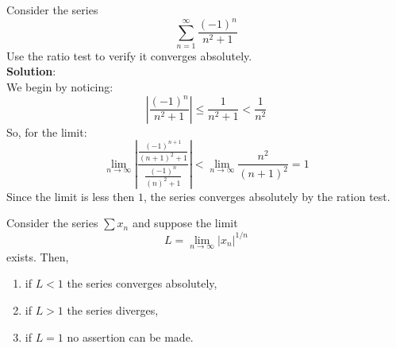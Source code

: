\begin{eg}
    Consider the series
    \begin{equation*}
        \sum \limits_{n=1}^\infty \frac{(-1)^n}{n^2+1}
    \end{equation*}
    Use the ratio test to verify it converges absolutely. \\
    \textbf{Solution}: \\
    We begin by noticing:
    \begin{equation*}
        \left |
            \frac{(-1)^n}{n^2+1}
        \right | \leq
        \frac{1}{n^2+1} <
        \frac{1}{n^2}
    \end{equation*}
    So, for the limit:
    \begin{equation*}
        \lim \limits_{n \to \infty} \left |
            \frac{
                \frac{(-1)^{n+1}}{(n+1)^2+1}
            }{
                \frac{(-1)^{n}}{(n)^2+1}
            }
        \right | <
        \lim \limits_{n \to \infty} \frac{n^2}{(n+1)^2} = 1
    \end{equation*}
    Since the limit is less then $1$, the series converges absolutely by the ration test.
\end{eg}

\begin{theorem}
    Consider the series $\sum x_n$ and suppose the limit
    \begin{equation*}
        L = \lim \limits_{n\to \infty} |x_n|^{1/n}
    \end{equation*}
    exists. Then,
    \begin{enumerate}
        \item if $L < 1$ the series converges absolutely,
        \item if $L > 1$ the series diverges,
        \item if $L = 1$ no assertion can be made.
    \end{enumerate}
\end{theorem}

